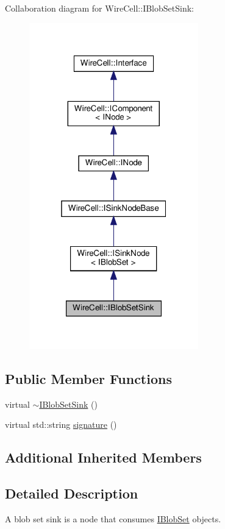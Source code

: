 Collaboration diagram for Wire\+Cell\+:\+:I\+Blob\+Set\+Sink\+:
\nopagebreak
\begin{figure}[H]
\begin{center}
\leavevmode
\includegraphics[width=208pt]{class_wire_cell_1_1_i_blob_set_sink__coll__graph}
\end{center}
\end{figure}
\subsection*{Public Member Functions}
\begin{DoxyCompactItemize}
\item 
virtual \hyperlink{class_wire_cell_1_1_i_blob_set_sink_a099e7c3b3d684ce26513690f2ce1f6e3}{$\sim$\+I\+Blob\+Set\+Sink} ()
\item 
virtual std\+::string \hyperlink{class_wire_cell_1_1_i_blob_set_sink_ac868e43c65bd6ebee9a5bceef87e7a57}{signature} ()
\end{DoxyCompactItemize}
\subsection*{Additional Inherited Members}


\subsection{Detailed Description}
A blob set sink is a node that consumes \hyperlink{class_wire_cell_1_1_i_blob_set}{I\+Blob\+Set} objects. 

